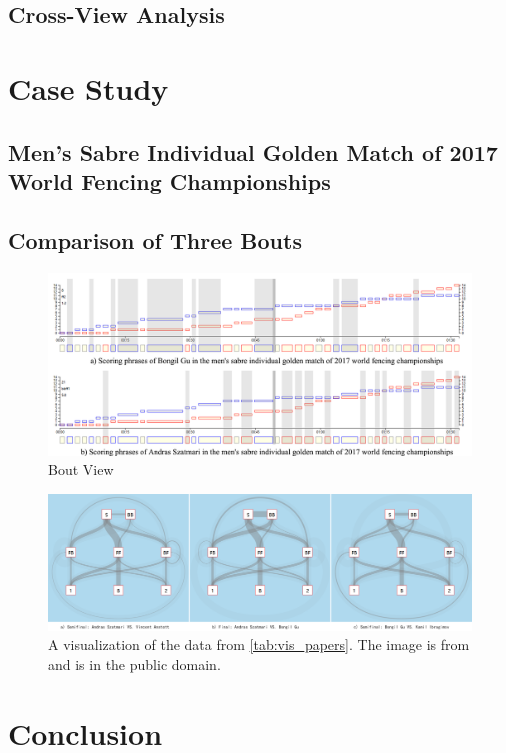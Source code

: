 \documentclass[journal]{vgtc}                %
\begin{document}
\subsection{Cross-View Analysis}

\section{Case Study}
\subsection{Men's Sabre Individual Golden Match of 2017 World Fencing Championships}

\subsection{Comparison of Three Bouts}

\begin{figure}[tb]
	\centering
	\includegraphics[width=\linewidth]{ScorePhrases}
	\caption{Bout View}
	\label{fig:boutview}
\end{figure}
\begin{figure}[tb]
	\centering
	\includegraphics[width=\linewidth]{threeBout}
	\caption{A visualization of the data from \autoref{tab:vis_papers}. The image is from \cite{Isenberg:2017:VMC} and is in the public domain.}
	\label{fig:sample}
\end{figure}

\section{Conclusion}






%

%
%
%


\end{document}
